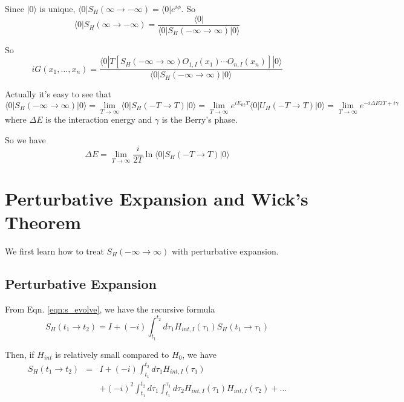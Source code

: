 \documentclass[12pt]{book}
\begin{document}
	Since $|0\rangle$ is unique, $\langle 0|S_H(\infty\rightarrow -\infty)=\langle 0|e^{i\phi}$. So
	\begin{equation}
		\langle 0|S_H(\infty\rightarrow -\infty)=\frac{\langle 0|}{\langle 0|S_H(-\infty\rightarrow \infty)|0\rangle}
	\end{equation}
	
	So
	\begin{equation}
		iG(x_1,\dots,x_n)=\frac{\langle 0|T[S_H(-\infty\rightarrow \infty)O_{1,I}(x_1)\cdots O_{n,I}(x_n)]|0\rangle}{\langle 0|S_H(-\infty\rightarrow \infty)|0\rangle}
	\end{equation}
	
	Actually it's easy to see that 
	\begin{equation}
		\langle 0|S_H(-\infty\rightarrow \infty)|0\rangle=\lim_{T\rightarrow \infty}\langle 0|S_H(-T\rightarrow T)|0\rangle=\lim_{T\rightarrow \infty}e^{iE_02T}\langle 0|U_H(-T\rightarrow T)|0\rangle=\lim_{T\rightarrow \infty}e^{-i\Delta E2T+i\gamma}
	\end{equation}
	where $\Delta E$ is the interaction energy and $\gamma$ is the Berry's phase.
	
	So we have
	\begin{equation}
		\Delta E=\lim_{T\rightarrow \infty}\frac i{2T}\ln\langle 0|S_H(-T\rightarrow T)|0\rangle
	\end{equation}
	
	\section{Perturbative Expansion and Wick's Theorem}
	We first learn how to treat $S_H(-\infty\rightarrow \infty)$ with perturbative expansion.
	\subsection{Perturbative Expansion}
	
	From Eqn. \ref{eqn:s_evolve}, we have the recursive formula
	\begin{equation}
		S_H(t_1\rightarrow t_2)=I+(-i)\int_{t_1}^{t_2}d\tau_1H_{int,I}(\tau_1)S_H(t_1\rightarrow \tau_1)
	\end{equation} 
	
	Then, if $H_{int}$ is relatively small compared to $H_0$, we have
	\begin{eqnarray}
		S_H(t_1\rightarrow t_2)&=&I+(-i)\int_{t_1}^{t_2}d\tau_1H_{int,I}(\tau_1)\nonumber \\
		&&+(-i)^2\int_{t_1}^{t_2}d\tau_1\int_{t_1}^{\tau_1}d\tau_2H_{int,I}(\tau_1)H_{int,I}(\tau_2)+\dots
	\end{eqnarray}
	
\end{document}
